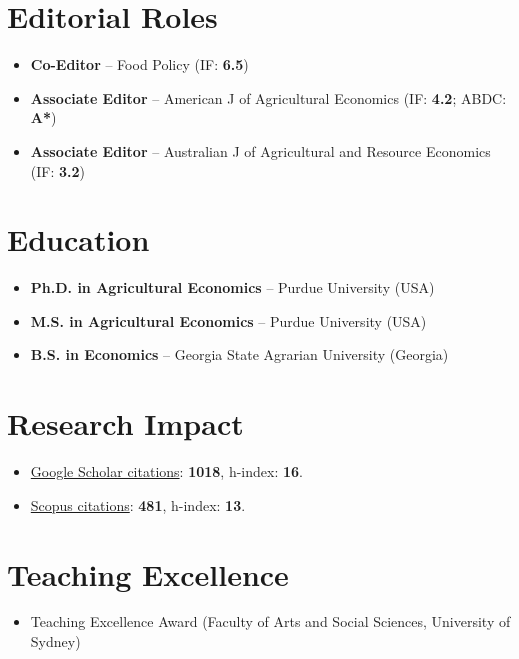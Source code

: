\documentclass[10pt]{article}
\begin{document}
	\section*{Editorial Roles}
	\begin{itemize}
		\item {} \textbf{Co-Editor} -- Food Policy (IF: \textbf{6.5})
		\item {} \textbf{Associate Editor} -- American J of Agricultural Economics (IF: \textbf{4.2}; ABDC: \textbf{A*})
		\item {} \textbf{Associate Editor} -- Australian J of Agricultural and Resource Economics (IF: \textbf{3.2})
	\end{itemize}
	
	\section*{Education}
	\begin{itemize}
		\item {} \textbf{Ph.D. in Agricultural Economics} -- Purdue University (USA)
		\item {} \textbf{M.S. in Agricultural Economics} -- Purdue University (USA)
		\item {} \textbf{B.S. in Economics} -- Georgia State Agrarian University (Georgia)
	\end{itemize}
	
	\section*{Research Impact}
	\begin{itemize}
		\item \href{https://scholar.google.com/citations?user=VbNOr6wAAAAJ&hl=en}{Google Scholar citations}: \textbf{1018}, h-index: \textbf{16}.
		\item \href{https://www.scopus.com/authid/detail.uri?authorId=26421832000}{Scopus citations}: \textbf{481}, h-index: \textbf{13}.	
	\end{itemize}
	
	\section*{Teaching Excellence}
	\begin{itemize}
		\item {} Teaching Excellence Award (Faculty of Arts and Social Sciences, University of Sydney)
	\end{itemize}
	
\end{document}

